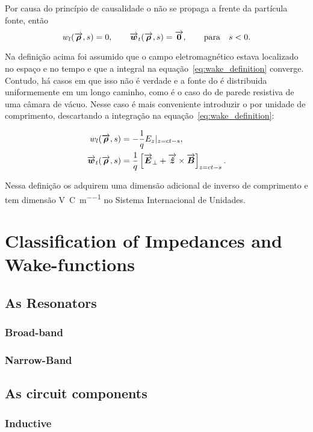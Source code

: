 \documentclass[
	12pt,				%
	openright,			%
	oneside,			%
	a4paper,		%
	chapter=TITLE,		%
	section=TITLE,		%
    brazil,				%
	english,			%
	sumario=tradicional,
	]{abntex2}
\begin{document}
	Por causa do princípio de causalidade o  não se propaga a frente da partícula fonte, então
	\begin{equation}
	    w_l(\overrightarrow{\boldsymbol{\rho}},s) = 0, \qquad \overrightarrow{\boldsymbol{w}}_t(\overrightarrow{\boldsymbol{\rho}},s) = \overrightarrow{\boldsymbol{0}}, \qquad \mathrm{para } \quad s < 0.
	\end{equation}

	Na definição acima foi assumido que o campo eletromagnético estava localizado no espaço e no tempo e que a integral na equação~\ref{eq:wake_definition} converge. Contudo, há casos em que isso não é verdade e a fonte do  é distribuida uniformemente em um longo caminho, como é o caso do  de parede resistiva de uma câmara de vácuo. Nesse caso é mais conveniente introduzir o  por unidade de comprimento, descartando a integração na equação~\ref{eq:wake_definition}:

	\begin{equation}\begin{aligned}
	    w_l(\overrightarrow{\boldsymbol{\rho}},s) &= -\frac1q E_z|_{z=ct-s}, \\
	    \overrightarrow{\boldsymbol{w}}_t(\overrightarrow{\boldsymbol{\rho}},s) &= \frac1q\left[\overrightarrow{\boldsymbol{E}}_\perp + \overrightarrow{\boldsymbol{\hat{z}}}\times \overrightarrow{\boldsymbol{B}}\right]_{z=ct-s}.
	\end{aligned}\end{equation}

	Nessa definição os  adquirem uma dimensão adicional de inverso de comprimento e tem dimensão \si{\volt\per\coulomb\per\meter} no Sistema Internacional de Unidades.


  \section{Classification of Impedances and Wake-functions}
    \subsection{As Resonators}
      \subsubsection{Broad-band}
      \subsubsection{Narrow-Band}
    \subsection{As circuit components}
      \subsubsection{Inductive}
\end{document}
